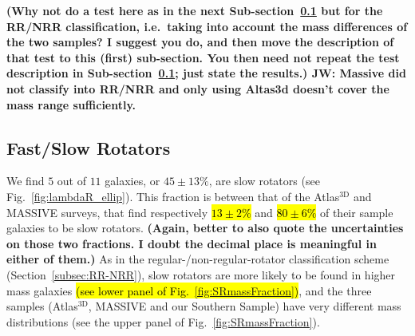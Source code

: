 \documentclass[a4paper,fleqn,usenatbib]{mnras}
\DeclareRobustCommand{\added}[1]{{\sethlcolor{green}\hl{#1}}}
\begin{document}
{\bf (Why not do a test here as in the next
  Sub-section~\ref{subsec:FR-SR} but for the RR/NRR classification,
  i.e.\ taking into account the mass differences of the two samples? I
  suggest you do, and then move the description of that test to this
  (first) sub-section. You then need not repeat the test description
  in Sub-section~\ref{subsec:FR-SR}; just state the results.) JW: Massive did not classify into RR/NRR and only using Altas3d doesn't cover the mass range sufficiently.}

\subsection{Fast/Slow Rotators}
\label{subsec:FR-SR}

We find $5$ out of $11$ galaxies, or $45\pm13\%$, are slow rotators
(see Fig.~\ref{fig:lambdaR_ellip}). This fraction is between that of
the Atlas$^\text{3D}$ and MASSIVE surveys, that find respectively
\added{$13\pm2\%$} and \added{$80\pm6\%$} of their sample galaxies to be slow
rotators. {\bf (Again, better to also quote the uncertainties on those
  two fractions. I doubt the decimal place is meaningful in either of
  them.)} As in the regular-/non-regular-rotator classification scheme
(Section~\ref{subsec:RR-NRR}), slow rotators are more likely to be
found in higher mass galaxies \added{(see lower panel of Fig.~\ref{fig:SRmassFraction})}, and the three samples
(Atlas$^\text{3D}$, MASSIVE and our Southern Sample) have very
different mass distributions (see the upper panel of
Fig.~\ref{fig:SRmassFraction}).
\end{document}
